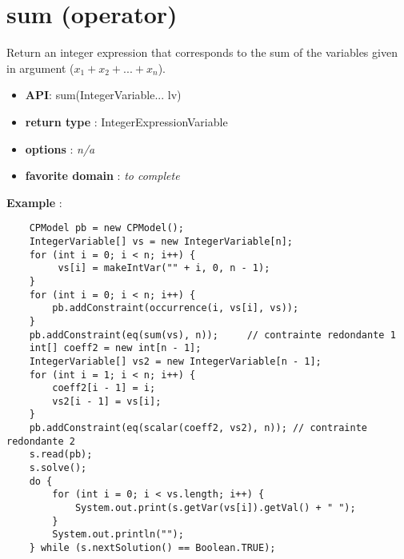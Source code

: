 \label{sum}
\hypertarget{sum}{}

\section{sum (operator)}\label{sum:sumoperator}\hypertarget{sum:sumoperator}{}
Return an integer expression that corresponds to the sum of the variables given in argument (\(x_1+x_2+...+x_n\)).

\begin{itemize}
	\item \textbf{API}: sum(IntegerVariable... lv)
	\item \textbf{return type} : IntegerExpressionVariable
	\item \textbf{options} : \emph{n/a}
	\item \textbf{favorite domain} : \emph{to complete}
\end{itemize}

\textbf{Example} :
\begin{lstlisting}
	CPModel pb = new CPModel();
	IntegerVariable[] vs = new IntegerVariable[n];
	for (int i = 0; i < n; i++) {
	     vs[i] = makeIntVar("" + i, 0, n - 1);
	}
	for (int i = 0; i < n; i++) {
	    pb.addConstraint(occurrence(i, vs[i], vs));
	}
	pb.addConstraint(eq(sum(vs), n));     // contrainte redondante 1
	int[] coeff2 = new int[n - 1];
	IntegerVariable[] vs2 = new IntegerVariable[n - 1];
	for (int i = 1; i < n; i++) {
	    coeff2[i - 1] = i;
	    vs2[i - 1] = vs[i];
	}
	pb.addConstraint(eq(scalar(coeff2, vs2), n)); // contrainte redondante 2
	s.read(pb);
	s.solve();
	do {
	    for (int i = 0; i < vs.length; i++) {
	        System.out.print(s.getVar(vs[i]).getVal() + " ");
	    }
	    System.out.println("");
	} while (s.nextSolution() == Boolean.TRUE);
\end{lstlisting}
